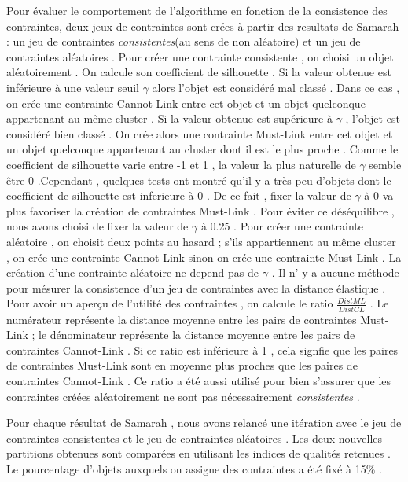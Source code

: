 \documentclass[11pt, openany]{report}
\begin{document}
Pour évaluer le comportement de l'algorithme en fonction de la consistence des contraintes,  deux jeux de contraintes sont crées à partir des resultats de Samarah : un jeu de contraintes \emph{consistentes}(au sens de non aléatoire)  et un jeu de contraintes aléatoires . Pour créer une contrainte consistente , on choisi un objet aléatoirement  . On calcule son coefficient de silhouette  .  Si la valeur obtenue est inférieure à une valeur seuil $\gamma$   alors l'objet est considéré mal classé . Dans ce cas ,  on crée une contrainte Cannot-Link entre cet objet et un objet quelconque appartenant au même cluster . Si la valeur obtenue est supérieure à $\gamma$ , l'objet est considéré bien classé . On crée alors une contrainte Must-Link entre cet objet et un objet quelconque appartenant au cluster dont il est le plus proche . Comme le coefficient de  silhouette varie entre -1 et 1 , la valeur la plus naturelle  de $\gamma$ semble être 0 .Cependant ,  quelques tests ont montré qu'il y a très peu d'objets dont le coefficient de silhouette est inferieure à 0 . De ce fait , fixer la valeur de $\gamma$ à 0 va plus favoriser la création de contraintes Must-Link . Pour éviter ce déséquilibre , nous avons choisi de fixer la valeur de $\gamma$ à 0.25 . Pour créer une contrainte  aléatoire , on choisit deux points au hasard  ; s'ils appartiennent au même cluster , on crée une contrainte Cannot-Link sinon on crée une contrainte Must-Link . La création d'une contrainte aléatoire ne depend pas de $\gamma$ .  Il n' y a aucune méthode pour mésurer la consistence d'un jeu de contraintes avec la distance élastique . Pour avoir un aperçu de l'utilité des contraintes ,  on calcule le ratio $\frac{DistML}{DistCL}$ . Le numérateur représente  la distance moyenne entre les pairs de contraintes Must-Link ; le dénominateur représente la distance moyenne  entre les pairs de contraintes Cannot-Link  . Si ce ratio est inférieure à 1 , cela signfie que les paires de contraintes Must-Link sont en moyenne plus proches  que les paires de contraintes Cannot-Link . Ce ratio a été  aussi utilisé pour bien s'assurer que les contraintes créées aléatoirement ne sont pas nécessairement \emph{consistentes} .

Pour chaque résultat de Samarah , nous avons relancé une itération avec le jeu de contraintes consistentes et le jeu de contraintes aléatoires . Les deux nouvelles partitions obtenues sont comparées en utilisant les indices de qualités retenues . Le pourcentage d'objets auxquels on assigne des contraintes a été fixé à 15\% .
\end{document}
